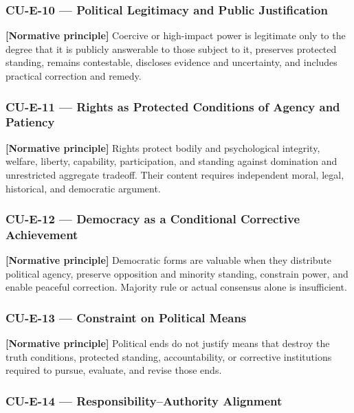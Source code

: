 \documentclass[
  11pt,
]{article}
\begin{document}
\subsubsection{CU-E-10 --- Political Legitimacy and Public
Justification}\label{cu-e-10-political-legitimacy-and-public-justification}

\textbf{{[}Normative principle{]}} Coercive or high-impact power is
legitimate only to the degree that it is publicly answerable to those
subject to it, preserves protected standing, remains contestable,
discloses evidence and uncertainty, and includes practical correction
and remedy.

\subsubsection{CU-E-11 --- Rights as Protected Conditions of Agency and
Patiency}\label{cu-e-11-rights-as-protected-conditions-of-agency-and-patiency}

\textbf{{[}Normative principle{]}} Rights protect bodily and
psychological integrity, welfare, liberty, capability, participation,
and standing against domination and unrestricted aggregate tradeoff.
Their content requires independent moral, legal, historical, and
democratic argument.

\subsubsection{CU-E-12 --- Democracy as a Conditional Corrective
Achievement}\label{cu-e-12-democracy-as-a-conditional-corrective-achievement}

\textbf{{[}Normative principle{]}} Democratic forms are valuable when
they distribute political agency, preserve opposition and minority
standing, constrain power, and enable peaceful correction. Majority rule
or actual consensus alone is insufficient.

\subsubsection{CU-E-13 --- Constraint on Political
Means}\label{cu-e-13-constraint-on-political-means}

\textbf{{[}Normative principle{]}} Political ends do not justify means
that destroy the truth conditions, protected standing, accountability,
or corrective institutions required to pursue, evaluate, and revise
those ends.

\subsubsection{CU-E-14 --- Responsibility--Authority
Alignment}\label{cu-e-14-responsibilityauthority-alignment}
\end{document}

